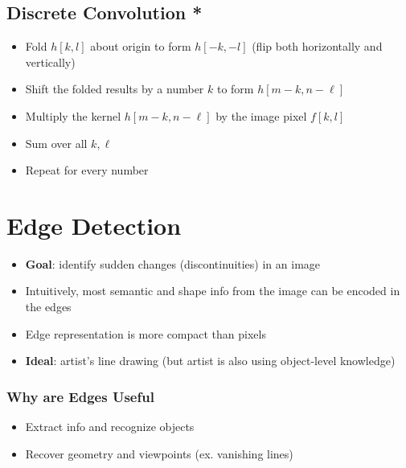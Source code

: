 \documentclass[letterpaper,12pt]{article}
\begin{document}
\subsection{Discrete Convolution *}
\begin{itemize}
 \item Fold $h[k,l]$ about origin to form $h[-k,-l]$ (flip both horizontally and vertically)
 \item Shift the folded results by a number $k$ to form $h[m-k, n-\ell]$
 \item Multiply the kernel $h[m-k, n-\ell]$ by the image pixel $f[k,l]$
 \item Sum over all $k,\ell$
 \item Repeat for every number
\end{itemize}

\section{Edge Detection}
\begin{itemize}
 \item \textbf{Goal}: identify sudden changes (discontinuities) in an image
 \item Intuitively, most semantic and shape info from the image can be encoded in the edges
 \item Edge representation is more compact than pixels
 \item \textbf{Ideal}: artist's line drawing (but artist is also using object-level knowledge)
\end{itemize}

\subsubsection{Why are Edges Useful}
\begin{itemize}
 \item Extract info and recognize objects
 \item Recover geometry and viewpoints  (ex. vanishing lines)
\end{itemize}
\end{document}

